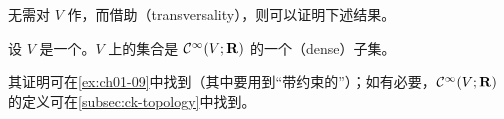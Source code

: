 无需对\trManifold{} $V$ 作\trEmbedding，而借助\textbf{\trTransversality}（transversality），则可以证明下述结果。

\begin{theorem}\label{thm:morse-dense-open}
设 $V$ 是一个\trCompact\trManifold。$V$ 上\trMorseFunction{}的集合是 $\mathcal{C}^\infty(V;\mathbf{R})$ 的一个\textbf{\trDense}（dense）\trOpen{}子集。
\end{theorem}

其证明可在\cref{ex:ch01-09}中找到（其中要用到“带约束的\trTransversality”）；如有必要，$\mathcal{C}^\infty(V;\mathbf{R})$ 的定义可在\cref{subsec:ck-topology}中找到。
